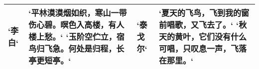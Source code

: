 \begin{table}[htbp]
\centering
\begin{tabularx}{350pt}{lXlX}
  \toprule
  `李白` & `平林漠漠烟如织，寒山一带伤心碧。暝色入高楼，有人楼上愁。`
  `玉阶空伫立，宿鸟归飞急。何处是归程，长亭更短亭。`& 
  `泰戈尔` & `夏天的飞鸟，飞到我的窗前唱歌，又飞去了。`
  `秋天的黄叶，它们没有什么可唱，只叹息一声，飞落在那里。`\\
  \bottomrule
\end{tabularx}
\end{table}
